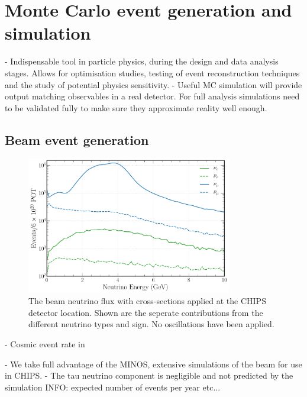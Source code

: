 \section{Monte Carlo event generation and simulation} %
\label{sec:chips_monte_carlo} %

- Indispensable tool in particle physics, during the design and data analysis stages. Allows for
optimisation studies, testing of event reconstruction techniques and the study of potential
physics sensitivity.
- Useful MC simulation will provide output matching observables in a real detector. For full
analysis simulations need to be validated fully to make sure they approximate reality well enough.

\subsection{Beam event generation} %
\label{sec:chips_monte_carlo_beam} %

\begin{figure} %
    \includegraphics[width=0.8\textwidth]{diagrams/4-chips/flux.pdf}
    \caption[\numi neutrino flux at CHIPS.]
    {The \numi beam neutrino flux with cross-sections applied at the CHIPS detector location. Shown
        are the seperate contributions from the different neutrino types and sign. No oscillations
        have been applied.}
    \label{fig:flux}
\end{figure}

- Cosmic event rate in \cite{son2013}

- We take full advantage of the MINOS, \nova extensive simulations of the \numi beam for use in
CHIPS.
- The tau neutrino component is negligible and not predicted by the simulation
INFO: expected number of events per year etc...


